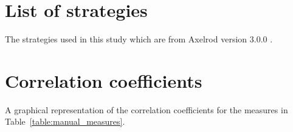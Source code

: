 \documentclass{article}
\begin{document}
\section{List of strategies}\label{app:list_of_players}

The strategies used in this study which are from Axelrod version 3.0.0
\cite{axelrodproject}.

\begin{multicols}{3}
	\begin{enumerate}
		
	\end{enumerate}
\end{multicols}


\section{Correlation coefficients}\label{app:correlations}

A graphical representation of the correlation coefficients for the measures in
Table~\ref{table:manual_measures}.
\end{document}

